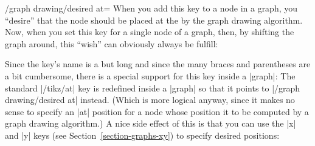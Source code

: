 \begin{key}{/graph drawing/desired at=}
  When you add this key to a node in a graph, you ``desire'' that the
  node should be placed at the  by the graph drawing
  algorithm. Now, when you set this key for a single node of a graph,
  then, by shifting the graph around, this ``wish'' can obviously
  always be fulfill:
\begin{codeexample}[]
\end{codeexample}
\begin{codeexample}[]
\end{codeexample}
\begin{codeexample}[]
\end{codeexample}
  Since the key's name is a but long and since the many braces and
  parentheses are a bit cumbersome, there is a special support for
  this key inside a |graph|: The standard |/tikz/at| key is redefined
  inside a |graph| so that it points to |/graph drawing/desired at|
  instead. (Which is more logical anyway, since it makes no sense to
  specify an |at| position for a node whose position it to be computed
  by a graph drawing algorithm.) A nice side effect of this is that
  you can use the |x| and |y| keys (see
  Section~\ref{section-graphs-xy}) to specify desired positions:
\begin{codeexample}[]
\end{codeexample}
\begin{codeexample}[]
\end{codeexample}


\end{key}
